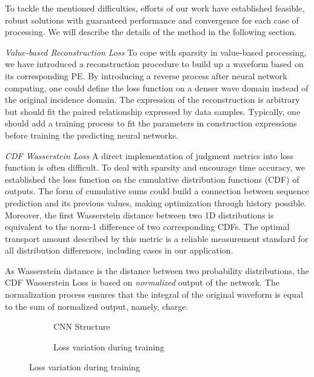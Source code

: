 To tackle the mentioned difficulties, efforts of our work have established feasible, robust solutions with guaranteed performance and convergence for each case of processing. We will describe the details of the method in the following section.

\emph{Value-based Reconstruction Loss}
To cope with sparsity in value-based processing, we have introduced a reconstruction procedure to build up a waveform based on its corresponding PE. By introducing a reverse process after neural network computing, one could define the loss function on a denser wave domain instead of the original incidence domain. The expression of the reconstruction is arbitrary but should fit the paired relationship expressed by data samples. Typically, one should add a training process to fit the parameters in construction expressions before training the predicting neural networks.

\emph{CDF Wasserstein Loss}
A direct implementation of judgment metrics into loss function is often difficult. To deal with sparsity and encourage time accuracy, we established the loss function on the cumulative distribution functions (CDF) of outputs. The form of cumulative sums could build a connection between sequence prediction and its previous values, making optimization through history possible. Moreover, the first Wasserstein distance between two 1D distributions is equivalent to the norm-1 difference of two corresponding CDFs. The optimal transport amount described by this metric is a reliable measurement standard for all distribution differences, including cases in our application. 

As Wasserstein distance is the distance between two probability distributions, the CDF Wasserstein Loss is based on \emph{normalized} output of the network. The normalization process ensures that the integral of the original waveform is equal to the sum of normalized output, namely, charge. 

\begin{figure}[H]
\begin{minipage}[b]{.4\textwidth}
\begin{figure}[H]
    \begin{center}
    \begin{adjustbox}{width=0.6\textwidth}
        
    \end{adjustbox}
    \end{center}
    \caption{\label{fig:struct} CNN Structure}
\end{figure}
\end{minipage}
\begin{minipage}[b]{.6\textwidth}
\begin{figure}[H]
    \centering
    \resizebox{\textwidth}{!}{}
    \caption{\label{fig:loss} Loss variation during training}
\end{figure}
\end{minipage}
\end{figure}

